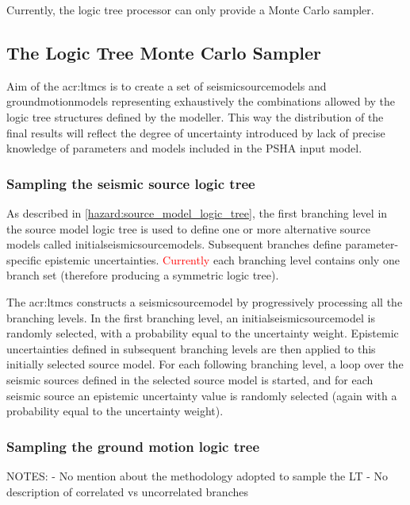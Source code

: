 Currently, the logic tree processor can only provide a Monte 
Carlo sampler.
%
\subsection{The Logic Tree Monte Carlo Sampler}
Aim of the \gls{acr:ltmcs} is to create a set of \glspl{seismicsourcemodel} 
and \glspl{groundmotionmodel} representing exhaustively the combinations 
allowed by the logic tree structures defined by the modeller.
% 
This way the distribution of the final results will reflect 
the degree of uncertainty introduced by lack of precise knowledge 
of parameters and models included in the PSHA input model.
%
\subsubsection{Sampling the seismic source logic tree}
As described in \ref{hazard:source_model_logic_tree}, the first branching 
level in the source model logic tree is used to define one or more 
alternative source models called \glspl{initialseismicsourcemodel}. 
%
Subsequent branches define parameter-specific epistemic uncertainties. 
\textcolor{red}{Currently} each branching level contains only one 
branch set (therefore producing a symmetric logic tree). 

The \gls{acr:ltmcs} constructs a \gls{seismicsourcemodel} by progressively
processing all the branching levels. In the first branching level, an 
\gls{initialseismicsourcemodel} is randomly selected, with a probability 
equal to the uncertainty 
weight. 
%
Epistemic uncertainties defined in subsequent branching levels are then 
applied to this initially selected source model. For each following 
branching level, a loop over the seismic sources defined in the selected
source model is started, and for each seismic source an epistemic 
uncertainty value is randomly selected (again with a probability equal to 
the uncertainty weight).
%
\subsubsection{Sampling the ground motion logic tree}

\dotfill \newline
NOTES:
- No mention about the methodology adopted to sample the LT
- No description of correlated vs uncorrelated branches
\hfill \clearpage

